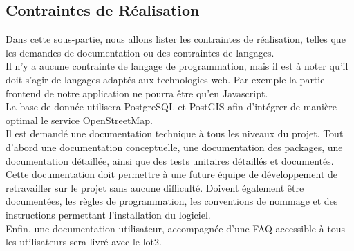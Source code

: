 \subsection{Contraintes de Réalisation}
Dans cette sous-partie, nous allons lister les contraintes de réalisation, telles que les demandes de documentation ou des contraintes de langages.\\

Il n'y a aucune contrainte de langage de programmation, mais il est à noter qu'il doit s'agir de langages adaptés aux technologies web. Par exemple la partie frontend de notre application ne pourra être qu'en Javascript.\\

La base de donnée utilisera PostgreSQL et PostGIS afin d'intégrer de manière optimal le service OpenStreetMap.\\

Il est demandé une documentation technique à tous les niveaux du projet. Tout d'abord une documentation conceptuelle, une documentation des packages, une documentation détaillée, ainsi que des tests unitaires détaillés et documentés. Cette documentation doit permettre à une future équipe de développement de retravailler sur le projet sans aucune difficulté. Doivent également être documentées, les règles de programmation, les conventions de nommage et des instructions permettant l'installation du logiciel.\\

Enfin, une documentation utilisateur, accompagnée d'une FAQ accessible à tous les utilisateurs sera livré avec le lot2.
